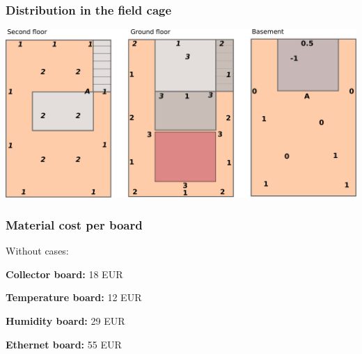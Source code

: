 \documentclass[t]{beamer}
\begin{document}
\begin{frame}[c]
    \frametitle{Distribution in the field cage}
  \begin{center}
  	\includegraphics[width=0.9\linewidth]{img/installPlan.pdf}\\
  \vspace{0.5cm}
  \end{center}
\end{frame}
\begin{frame}[c]
    \frametitle{Material cost per board}
		Without cases:
		\begin{description}
			\item{\textbf{Collector board:}} 18 EUR
			\item{\textbf{Temperature board:}} 12 EUR
			\item{\textbf{Humidity board:}} 29 EUR
			\item{\textbf{Ethernet board:}} 55 EUR
		\end{description}

\end{frame}
\end{document}
